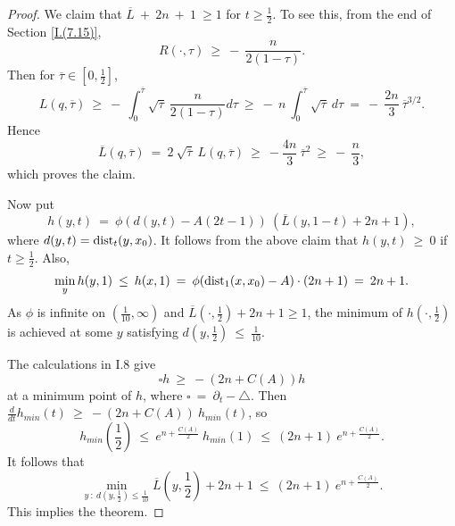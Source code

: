 \begin{proof}
We claim that $\overline{L} \: + \: 2n \: + \: 1 \: \ge 1$ for
$t \ge \frac12$. To see this, from the end of Section \ref{I.(7.15)},
\begin{equation}
R(\cdot, \tau) \: \ge \: - \: \frac{n}{2(1-\tau)}.
\end{equation}
Then for $\overline{\tau} \in [0, \frac12]$,
\begin{equation}
L(q, \overline{\tau}) \: \ge \: - \:
\int_0^{\overline{\tau}} \sqrt{\tau} \: \frac{n}{2(1-\tau)}
d\tau \: \ge \: - \: n \:
\int_0^{\overline{\tau}} \sqrt{\tau} \:
d\tau \: = \: - \: \frac{2n}{3} \:
{\overline{\tau}}^{3/2}.
\end{equation}
Hence
\begin{equation}
\overline{L}(q, \overline{\tau}) \: = \: 2 \: \sqrt{\overline{\tau}} \:
L(q, \overline{\tau}) \: \ge \: - \frac{4n}{3} \:
\overline{\tau}^2 \: \ge \:
- \: \frac{n}{3},
\end{equation}
which proves the claim.

Now put
\begin{equation}
h(y,t) \: = \: \phi(d(y,t) - A(2t-1)) \:
(\overline{L}(y,1-t) +2n+1),
\end{equation}
where $d(y,t) = \operatorname{dist}_t(y,x_0)$.
It follows from the above claim that $h(y,t) \: \ge \: 0$
if $t \ge \frac12$.
Also,
\begin{equation}
\min_y h(y,1) \: \le \: h(x,1) \: = \:
\phi(\operatorname{dist}_1(x,x_0) - A) \cdot (2n+1) \: = \: 2n+1.
\end{equation}
As $\phi$ is infinite on $(\frac{1}{10}, \infty)$ and
$\overline{L}(\cdot, \frac12) +2n+1 \ge 1$, the
minimum of $h(\cdot, \frac12)$ is achieved at some
$y$ satisfying $d(y,\frac12) \: \le \: \frac{1}{10}$.

The calculations in I.8 give
\begin{equation}
\square h \: \ge \: -(2n+C(A)) h
\end{equation}
at a minimum point of $h$,
where $\square \: = \: \partial_t - \triangle$.
Then $\frac{d}{dt} h_{min}(t) \: \ge \: -(2n+C(A)) \: h_{min}(t)$,
so
\begin{equation}
h_{min} \left( \frac12 \right)
\: \le \: e^{n+\frac{C(A)}{2}} \: h_{min}(1)
\: \le \: (2n+1) \: e^{n+\frac{C(A)}{2}}.
\end{equation}
It follows that
\begin{equation}
\min_{y \: : \: d(y, \frac12) \le \frac{1}{10}}
\overline{L}(y, \frac12) +2n+1 \: \le
\: (2n+1) \: e^{n+\frac{C(A)}{2}}.
\end{equation}
This implies the theorem.
\end{proof}

